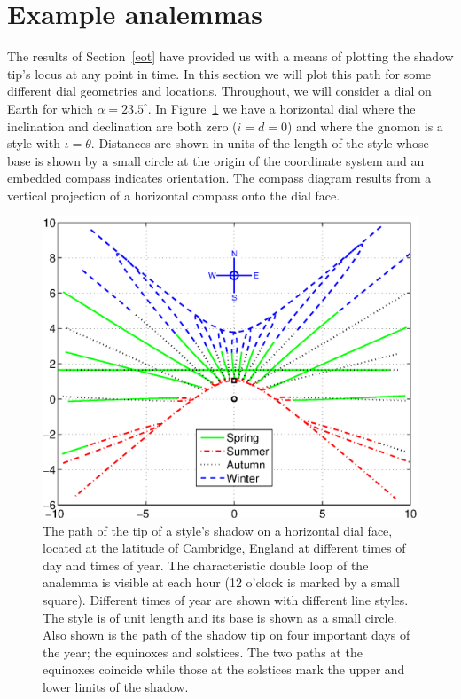 \documentclass[12pt]{article}
\begin{document}
\section{Example analemmas} \label{secPaths}
%
The results of Section~\ref{eot} have provided us with a means of plotting the shadow tip's locus at any point in time. In this section we will plot this path for some different dial geometries and locations. Throughout, we will consider a dial on Earth for which $\alpha = 23.5^\circ$. In Figure~\ref{horizDial} we have a horizontal dial where the inclination and declination are both zero ($i = d = 0$) and where the gnomon is a style with $\iota = \theta$. Distances are shown in units of the length of the style whose base is shown by a small circle at the origin of the coordinate system and an embedded compass indicates orientation. The compass diagram results from a vertical projection of a horizontal compass onto the dial face.
%
\begin{figure}[ht!]
\centering
\includegraphics[width=13cm]{figs/figure7.eps}
\caption{The path of the tip of a style's shadow on a horizontal dial face, located at the latitude of Cambridge, England at different times of day and times of year. The characteristic double loop of the analemma is visible at each hour (12 o'clock is marked by a small square). Different times of year are shown with different line styles. The style is of unit length and its base is shown as a small circle. Also shown is the path of the shadow tip on four important days of the year; the equinoxes and solstices. The two paths at the equinoxes coincide while those at the solstices mark the upper and lower limits of the shadow.\label{horizDial}}
\end{figure}
\end{document}
